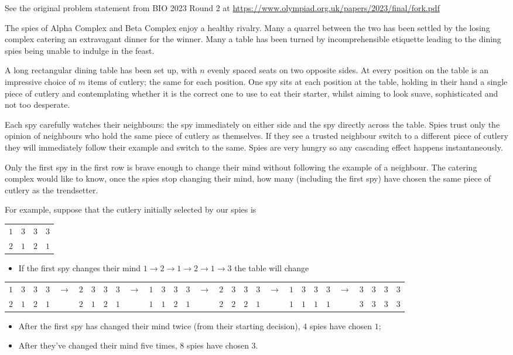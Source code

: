 \begin{center}\small{
  See the original problem statement from BIO 2023 Round 2 at
  \url{https://www.olympiad.org.uk/papers/2023/final/fork.pdf}
}\end{center}

The spies of Alpha Complex and Beta Complex enjoy a healthy rivalry. Many a quarrel between the two has been settled by the losing complex catering an extravagant dinner for the winner. Many a table has been turned by incomprehensible etiquette leading to the dining spies being unable to indulge in the feast.

A long rectangular dining table has been set up, with $n$ evenly spaced seats on two opposite sides. At every position on the table is an impressive choice of $m$ items of cutlery; the same for each position. One spy sits at each position at the table, holding in their hand a single piece of cutlery and contemplating whether it is the correct one to use to eat their starter, whilst aiming to look suave, sophisticated and not too desperate.

Each spy carefully watches their neighbours: the spy immediately on either side and the spy directly across the table. Spies trust only the opinion of neighbours who hold the same piece of cutlery as themselves. If they see a trusted neighbour switch to a different piece of cutlery they will immediately follow their example and switch to the same. Spies are very hungry so any cascading effect happens instantaneously.

Only the first spy in the first row is brave enough to change their mind without following the example of a neighbour. The catering complex would like to know, once the spies stop changing their mind, how many (including the first spy) have chosen the same piece of cutlery as the trendsetter.

For example, suppose that the cutlery initially selected by our spies is
\begin{center}
  \begin{tabular}{llll}
    $1$ & $3$ & $3$ & $3$ \\
    $2$ & $1$ & $2$ & $1$
  \end{tabular}
\end{center}

\begin{itemize}
  \item If the first spy changes their mind $1\rightarrow2\rightarrow1\rightarrow2\rightarrow1\rightarrow3$ the table will change
\end{itemize}
    \begin{tabular}{lllllllllllllllllllllllllllll}
      $1$&$3$&$3$&$3$ &\multirow{2}{*}{$\rightarrow$}& $2$&$3$&$3$&$3$ &\multirow{2}{*}{$\rightarrow$}& $1$&$3$&$3$&$3$ &\multirow{2}{*}{$\rightarrow$}& $2$&$3$&$3$&$3$ &\multirow{2}{*}{$\rightarrow$}& $1$&$3$&$3$&$3$ &\multirow{2}{*}{$\rightarrow$}& $3$&$3$&$3$&$3$ \\
      $2$&$1$&$2$&$1$ && $2$&$1$&$2$&$1$ && $1$&$1$&$2$&$1$ && $2$&$2$&$2$&$1$ && $1$&$1$&$1$&$1$ && $3$&$3$&$3$&$3$
    \end{tabular}


\begin{itemize}
  \item After the first spy has changed their mind twice (from their starting
decision), $4$ spies have chosen $1$;
  \item After they've changed their mind five times, $8$ spies have chosen $3$.
\end{itemize}
